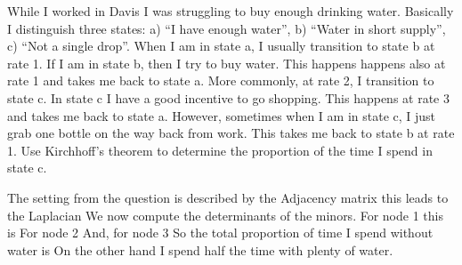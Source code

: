 
While I worked in Davis I was struggling to buy enough drinking water. Basically I distinguish three states: a) ``I have enough water'',  b) ``Water in short supply'', c) ``Not a single drop''. When I am in state a, I usually transition to state b at rate 1. If I am in state b, then I try to buy water. This happens happens also at rate 1 and takes me back to state a. More commonly, at rate 2, I transition to state c. In state c I have a good incentive to go shopping. This happens at rate 3 and takes me back to state a. However, sometimes when I am in state c, I just grab one bottle on the way back from work. This takes me back to state b at rate 1.  Use Kirchhoff's theorem to determine the proportion of the time I spend in state c. 

\solution

The setting from the question is described by the Adjacency matrix 
this leads to the Laplacian
We now compute the determinants of the minors. For node 1 this is 
For node 2 
And, for node 3
So the total proportion of time I spend without water is 
On the other hand I spend half the time with plenty of water. 

